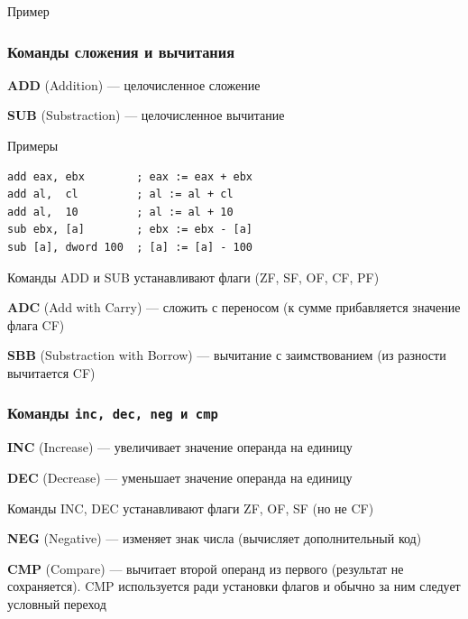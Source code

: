 \documentclass[utf8, russian]{beamer}
\begin{document}
    \begin{frame}{Пример}
    \end{frame}
    \begin{frame}[fragile]
        \frametitle{Команды сложения и вычитания}
        {\bf ADD} (Addition) --- целочисленное сложение

        {\bf SUB} (Substraction) --- целочисленное вычитание
        \begin{block}{Примеры}
            \begin{verbatim}
add eax, ebx        ; eax := eax + ebx
add al,  cl         ; al := al + cl
add al,  10         ; al := al + 10
sub ebx, [a]        ; ebx := ebx - [a] 
sub [a], dword 100  ; [a] := [a] - 100
            \end{verbatim}
        \end{block}
        Команды ADD и SUB устанавливают флаги (ZF, SF, OF, CF, PF)

        {\bf ADC} (Add with Carry) --- сложить с переносом (к сумме прибавляется значение флага CF)

        {\bf SBB} (Substraction with Borrow) --- вычитание с заимствованием (из разности вычитается CF)
\end{frame}
    \begin{frame}[fragile]
        \frametitle{Команды \tt inc, dec, neg и cmp}
        {\bf INC} (Increase) --- увеличивает значение операнда на единицу

        {\bf DEC} (Decrease) --- уменьшает значение операнда на единицу

        Команды INC, DEC устанавливают флаги ZF, OF, SF (но не CF)

        \bigskip
        {\bf NEG} (Negative) --- изменяет знак числа (вычисляет дополнительный код)

        {\bf CMP} (Compare) --- вычитает второй операнд из первого (результат не сохраняется). CMP используется ради установки флагов и обычно за ним следует условный переход
\end{frame}
\end{document}

